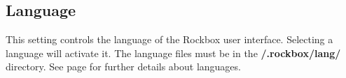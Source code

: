   \subsection{\label{ref:Language}Language}
  This setting controls the language of the Rockbox user interface. Selecting  a language will activate it. The language files must be in the \textbf{/.rockbox/lang/} directory. See page \pageref{ref:Loadinglanguages} for further details about languages.
